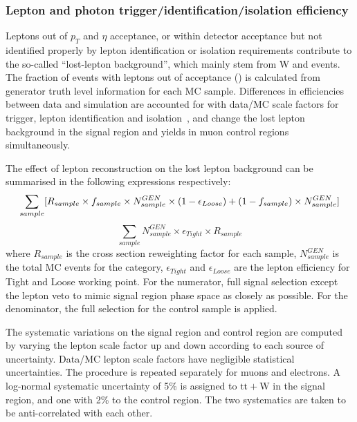 \subsubsection*{Lepton and photon trigger/identification/isolation efficiency}
\label{sec:tfSyst_lepton}
Leptons out of $p_{T}$ and $\eta$ acceptance, or within detector
acceptance but not identified properly by lepton identification or isolation
requirements contribute to the so-called ``lost-lepton background'', 
which mainly stem from W and \ttbar events. 
The fraction of events with leptons out of acceptance (\flepAccep)
is calculated from generator truth level information for each MC
sample. Differences in efficiencies between data and simulation are
accounted for with data/MC scale
factors for trigger, lepton identification and isolation~\cite{twiki-leptonSF}, 
and change the lost lepton background in the signal region and yields in 
muon control regions simultaneously.

The effect of lepton reconstruction on the lost lepton background
can be summarised in the following expressions respectively:
\begin{equation}
    \label{eq:lostLepSR}
    \sum_{sample} [ R_{sample} \times f_{sample} \times N^{GEN}_{sample} \times ( 1 - \epsilon_{Loose} ) + ( 1 - f_{sample} ) \times N^{GEN}_{sample} ]
\end{equation}
\begin{equation}
    \label{eq:lostLepCR}
    \sum_{sample} N^{GEN}_{sample} \times \epsilon_{Tight} \times R_{sample}
\end{equation}
where $R_{sample}$ is the cross section reweighting factor for each sample, 
$N^{GEN}_{sample}$ is the total MC events for the category, $\epsilon_{Tight}$
and $\epsilon_{Loose}$ are the lepton efficiency for Tight and Loose working 
point. For the numerator, full
signal selection except the lepton veto to mimic signal region phase space as
closely as possible. For the denominator, the full selection for the \mj 
control sample is applied.

The systematic variations on the signal region and control region are computed 
by varying the lepton scale factor
up and down according to each source of uncertainty.
Data/MC lepton scale factors have negligible statistical uncertainties. 
The procedure is repeated separately for muons and
electrons.
A log-normal systematic uncertainty of 5\% is assigned to $\mathrm{tt+W}$ in the signal region, 
and one with 2\% to the control region. The two systematics are taken to be anti-correlated 
with each other.

